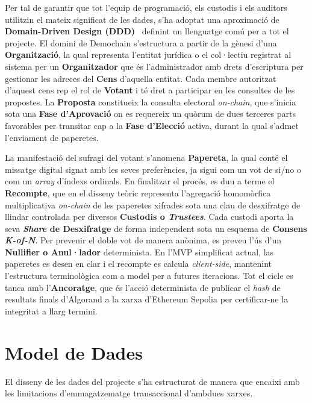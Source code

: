 Per tal de garantir que tot l'equip de programació, els custodis i els auditors utilitzin el mateix significat de les
dades, s'ha adoptat una aproximació de \textbf{Domain-Driven Design (DDD)}~\cite{evans2003ddd} definint un llenguatge comú per a tot el
projecte.
El domini de Demochain s'estructura a partir de la gènesi d'una \textbf{Organització}, la qual representa l'entitat
jurídica o el col·lectiu registrat al sistema per un \textbf{Organitzador} que és l'administrador amb drets d'escriptura
per gestionar les adreces del \textbf{Cens} d'aquella entitat.
Cada membre autoritzat d'aquest cens rep el rol de \textbf{Votant} i té dret a participar en les consultes de les
propostes.
La \textbf{Proposta} constitueix la consulta electoral \textit{on-chain}, que s'inicia sota una \textbf{Fase
d'Aprovació} on es requereix un quòrum de dues terceres parts favorables per transitar cap a la \textbf{Fase d'Elecció}
activa, durant la qual s'admet l'enviament de paperetes.

La manifestació del sufragi del votant s'anomena \textbf{Papereta}, la qual conté el missatge digital signat amb les
seves preferències, ja sigui com un vot de si/no o com un \textit{array} d'índexs ordinals.
En finalitzar el procés, es duu a terme el \textbf{Recompte}, que en el disseny teòric representa l'agregació
homomòrfica multiplicativa \textit{on-chain} de les paperetes xifrades sota una clau de desxifratge de llindar
controlada per diversos \textbf{Custodis o \textit{Trustees}}.
Cada custodi aporta la seva \textbf{\textit{Share} de Desxifratge} de forma independent sota un esquema de
\textbf{Consens \textit{K-of-N}}.
Per prevenir el doble vot de manera anònima, es preveu l'ús d'un \textbf{Nullifier o Anul·lador} determinista.
En l'\ac{MVP} simplificat actual, las paperetes es desen en clar i el recompte es calcula \textit{client-side},
mantenint l'estructura terminològica com a model per a futures iteracions.
Tot el cicle es tanca amb l'\textbf{Ancoratge}, que és l'acció determinista de publicar el \textit{hash} de resultats
finals d'Algorand a la xarxa d'Ethereum Sepolia per certificar-ne la integritat a llarg termini.


\section{Model de Dades}
\label{sec:model-dades}

El disseny de les dades del projecte s'ha estructurat de manera que encaixi amb les limitacions d'emmagatzematge
transaccional d'ambdues xarxes.

